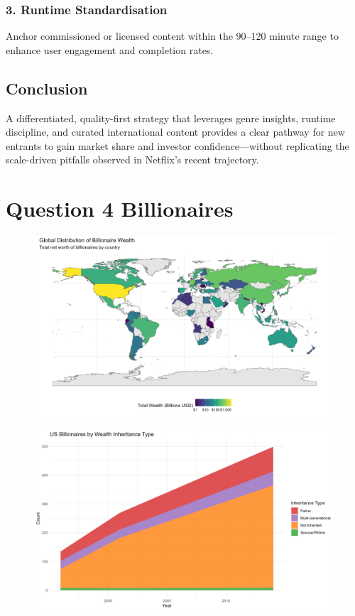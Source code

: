 \documentclass[
  man,floatsintext]{apa6}
\begin{document}
\subsubsection{3. Runtime Standardisation}\label{runtime-standardisation}

Anchor commissioned or licensed content within the 90--120 minute range to enhance user engagement and completion rates.

\subsection{Conclusion}\label{conclusion}

A differentiated, quality-first strategy that leverages genre insights, runtime discipline, and curated international content provides a clear pathway for new entrants to gain market share and investor confidence---without replicating the scale-driven pitfalls observed in Netflix's recent trajectory.

\section{Question 4 Billionaires}\label{question-4-billionaires}

\begin{figure}
\includegraphics[width=0.9\linewidth]{../Question4/Results/wealthmap} \caption{ }\label{fig:wealthmap-image}
\end{figure}

\begin{figure}
\includegraphics[width=0.9\linewidth]{../Question4/Results/inheritance} \caption{ }\label{fig:inheritance-image}
\end{figure}
\end{document}
